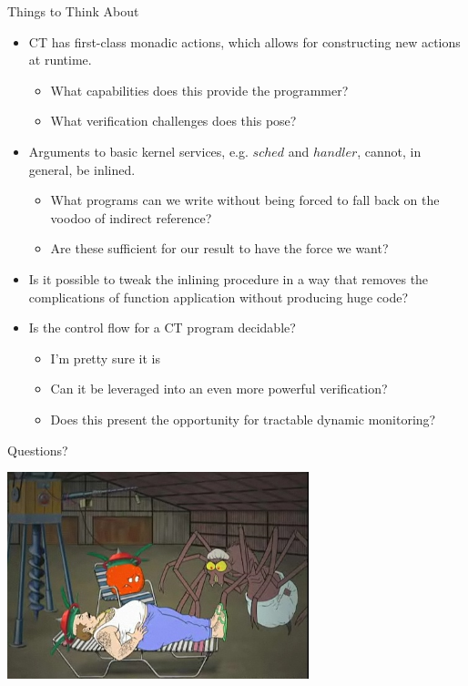 \documentclass{beamer}
\begin{document}
\begin{frame}{Things to Think About}

\begin{itemize}

\item{CT has first-class monadic actions, which allows for constructing new actions at runtime.
\begin{itemize}\item{What capabilities does this provide the programmer?} \item{What verification challenges does this pose?}\end{itemize}}

\smallskip

\item{Arguments to basic kernel services, e.g. $sched$ and $handler$, cannot, in general, be inlined.  \begin{itemize}\item{What programs can we write without being forced to fall back on the voodoo of indirect reference?}\item{Are these sufficient for our result to have the force we want?}\end{itemize}}

\item{Is it possible to tweak the inlining procedure in a way that removes the complications of function application without producing huge code?}

\item{Is the control flow for a CT program decidable?
\begin{itemize}\item{I'm pretty sure it is} \item{Can it be leveraged into an even more powerful verification?}\item{Does this present the opportunity for tractable dynamic monitoring?}\end{itemize}}

\end{itemize}

\end{frame}

\begin{frame}{Questions?}

\begin{center}
\includegraphics[height=6cm]{looked_different}


\end{center}

\end{frame}
\end{document}
